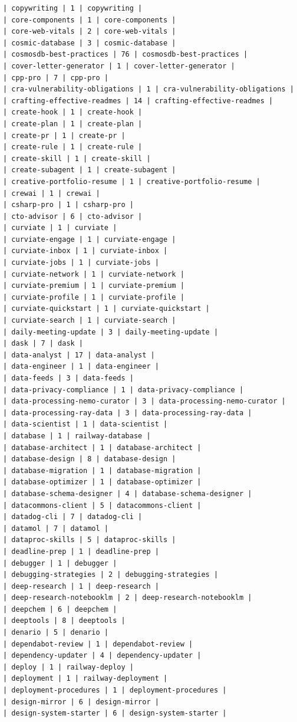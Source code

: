 \begin{Verbatim}[breaklines,breakanywhere,fontsize=\footnotesize]
| copywriting | 1 | copywriting |
| core-components | 1 | core-components |
| core-web-vitals | 2 | core-web-vitals |
| cosmic-database | 3 | cosmic-database |
| cosmosdb-best-practices | 76 | cosmosdb-best-practices |
| cover-letter-generator | 1 | cover-letter-generator |
| cpp-pro | 7 | cpp-pro |
| cra-vulnerability-obligations | 1 | cra-vulnerability-obligations |
| crafting-effective-readmes | 14 | crafting-effective-readmes |
| create-hook | 1 | create-hook |
| create-plan | 1 | create-plan |
| create-pr | 1 | create-pr |
| create-rule | 1 | create-rule |
| create-skill | 1 | create-skill |
| create-subagent | 1 | create-subagent |
| creative-portfolio-resume | 1 | creative-portfolio-resume |
| crewai | 1 | crewai |
| csharp-pro | 1 | csharp-pro |
| cto-advisor | 6 | cto-advisor |
| curviate | 1 | curviate |
| curviate-engage | 1 | curviate-engage |
| curviate-inbox | 1 | curviate-inbox |
| curviate-jobs | 1 | curviate-jobs |
| curviate-network | 1 | curviate-network |
| curviate-premium | 1 | curviate-premium |
| curviate-profile | 1 | curviate-profile |
| curviate-quickstart | 1 | curviate-quickstart |
| curviate-search | 1 | curviate-search |
| daily-meeting-update | 3 | daily-meeting-update |
| dask | 7 | dask |
| data-analyst | 17 | data-analyst |
| data-engineer | 1 | data-engineer |
| data-feeds | 3 | data-feeds |
| data-privacy-compliance | 1 | data-privacy-compliance |
| data-processing-nemo-curator | 3 | data-processing-nemo-curator |
| data-processing-ray-data | 3 | data-processing-ray-data |
| data-scientist | 1 | data-scientist |
| database | 1 | railway-database |
| database-architect | 1 | database-architect |
| database-design | 8 | database-design |
| database-migration | 1 | database-migration |
| database-optimizer | 1 | database-optimizer |
| database-schema-designer | 4 | database-schema-designer |
| datacommons-client | 5 | datacommons-client |
| datadog-cli | 7 | datadog-cli |
| datamol | 7 | datamol |
| dataproc-skills | 5 | dataproc-skills |
| deadline-prep | 1 | deadline-prep |
| debugger | 1 | debugger |
| debugging-strategies | 2 | debugging-strategies |
| deep-research | 1 | deep-research |
| deep-research-notebooklm | 2 | deep-research-notebooklm |
| deepchem | 6 | deepchem |
| deeptools | 8 | deeptools |
| denario | 5 | denario |
| dependabot-review | 1 | dependabot-review |
| dependency-updater | 4 | dependency-updater |
| deploy | 1 | railway-deploy |
| deployment | 1 | railway-deployment |
| deployment-procedures | 1 | deployment-procedures |
| design-mirror | 6 | design-mirror |
| design-system-starter | 6 | design-system-starter |

\end{Verbatim}
